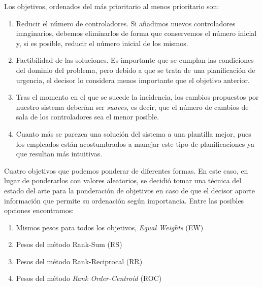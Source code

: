 Los objetivos, ordenados del más prioritario al menos prioritario son:

\begin{enumerate}[label={O\arabic*}]
    \item \label{O1} Reducir el número de controladores. Si añadimos nuevos controladores imaginarios, debemos eliminarlos de forma que conservemos el número inicial y, si es posible, reducir el número inicial de los mismos.

    \item \label{O2} Factibilidad de las soluciones. Es importante que se cumplan las condiciones del dominio del problema, pero debido a que se trata de una planificación de urgencia, el decisor lo considera menos importante que el objetivo anterior.

    \item \label{O3} Tras el momento en el que se sucede la incidencia, los cambios propuestos por nuestro sistema deberían ser \textit{suaves}, es decir, que el número de cambios de sala de los controladores sea el menor posible.

    \item \label{O4} Cuanto más se parezca una solución del sistema a una plantilla mejor, pues los empleados están acostumbrados a manejar este tipo de planificaciones ya que resultan más intuitivas.
\end{enumerate}

%
	Cuatro objetivos que podemos ponderar de diferentes formas. En este caso, en lugar de ponderarlos con valores aleatorios, se decidió tomar una técnica del estado del arte para la ponderación de objetivos en caso de que el decisor aporte información que permite su ordenación según importancia. Entre las posibles opciones encontramos:
    
    \begin{enumerate}[label=\alph*)]
        \item Mismos pesos para todos los objetivos, \textit{Equal Weights} (EW)~\cite{ew-paper}
        \item Pesos del método Rank-Sum (RS)~\cite{rs-rr-paper}
        \item Pesos del método Rank-Reciprocal (RR)~\cite{rs-rr-paper}
        \item Pesos del método \textit{Rank Order-Centroid} (ROC)~\cite{roc-paper}
    \end{enumerate}
%

